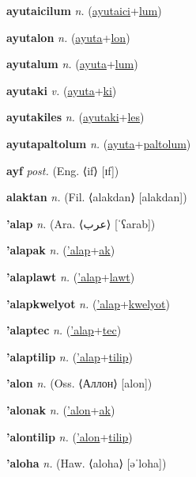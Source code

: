 \textbf{\hypertarget{ayutaicilum}{ayutaicilum}} \textit{n.} (\hyperlink{ayutaici}{ayutaici}+\allowbreak \hyperlink{lum}{lum})


\textbf{\hypertarget{ayutalon}{ayutalon}} \textit{n.} (\hyperlink{ayuta}{ayuta}+\allowbreak \hyperlink{lon}{lon})


\textbf{\hypertarget{ayutalum}{ayutalum}} \textit{n.} (\hyperlink{ayuta}{ayuta}+\allowbreak \hyperlink{lum}{lum})


\textbf{\hypertarget{ayutaki}{ayutaki}} \textit{v.} (\hyperlink{ayuta}{ayuta}+\allowbreak \hyperlink{ki}{ki})


\textbf{\hypertarget{ayutakiles}{ayutakiles}} \textit{n.} (\hyperlink{ayutaki}{ayutaki}+\allowbreak \hyperlink{les}{les})


\textbf{\hypertarget{ayutapaltolum}{ayutapaltolum}} \textit{n.} (\hyperlink{ayuta}{ayuta}+\allowbreak \hyperlink{paltolum}{paltolum})


\textbf{\hypertarget{ayf}{ayf}} \textit{post.} (Eng. ⟨if⟩ [ɪf])


\textbf{\hypertarget{alaktan}{alaktan}} \textit{n.} (Fil. ⟨alakdan⟩ [alakdan])


\textbf{\hypertarget{'alap}{'alap}} \textit{n.} (Ara. ⟨{\arabics{}عرب}⟩ [ˈʕarab])


\textbf{\hypertarget{'alapak}{'alapak}} \textit{n.} (\hyperlink{'alap}{'alap}+\allowbreak \hyperlink{ak}{ak})


\textbf{\hypertarget{'alaplawt}{'alaplawt}} \textit{n.} (\hyperlink{'alap}{'alap}+\allowbreak \hyperlink{lawt}{lawt})


\textbf{\hypertarget{'alapkwelyot}{'alapkwelyot}} \textit{n.} (\hyperlink{'alap}{'alap}+\allowbreak \hyperlink{kwelyot}{kwelyot})


\textbf{\hypertarget{'alaptec}{'alaptec}} \textit{n.} (\hyperlink{'alap}{'alap}+\allowbreak \hyperlink{tec}{tec})


\textbf{\hypertarget{'alaptilip}{'alaptilip}} \textit{n.} (\hyperlink{'alap}{'alap}+\allowbreak \hyperlink{tilip}{tilip})


\textbf{\hypertarget{'alon}{'alon}} \textit{n.} (Oss. ⟨Аллон⟩ [alon])


\textbf{\hypertarget{'alonak}{'alonak}} \textit{n.} (\hyperlink{'alon}{'alon}+\allowbreak \hyperlink{ak}{ak})


\textbf{\hypertarget{'alontilip}{'alontilip}} \textit{n.} (\hyperlink{'alon}{'alon}+\allowbreak \hyperlink{tilip}{tilip})


\textbf{\hypertarget{'aloha}{'aloha}} \textit{n.} (Haw. ⟨aloha⟩ [əˈloha])


